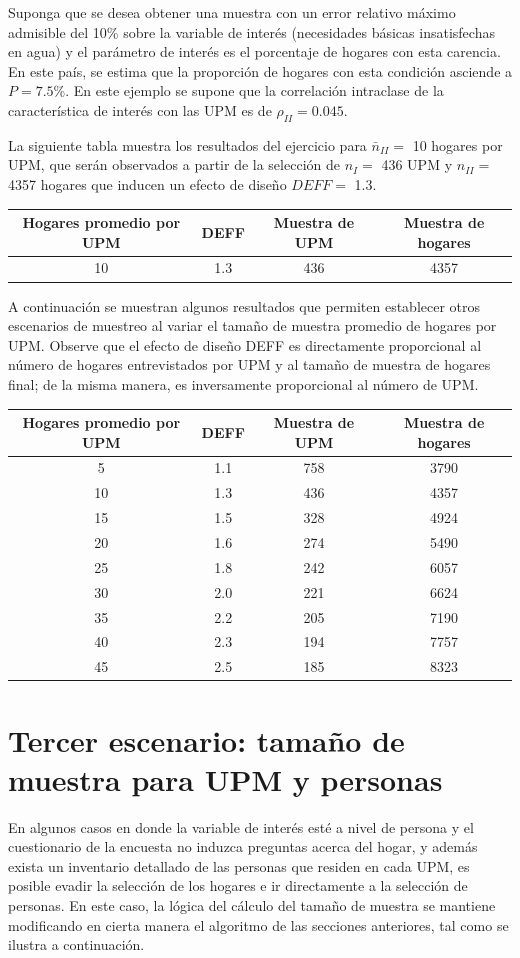 Suponga que se desea obtener una muestra con un error relativo máximo admisible del 10\% sobre la variable de interés (necesidades básicas insatisfechas en agua) y el parámetro de interés es el porcentaje de hogares con esta carencia. En este país, se estima que la proporción de hogares con esta condición asciende a \(P = 7.5\)\%. En este ejemplo se supone que la correlación intraclase de la característica de interés con las UPM es de \(\rho_{II} = 0.045\).

La siguiente tabla muestra los resultados del ejercicio para \(\bar{n}_{II} =\) 10 hogares por UPM, que serán observados a partir de la selección de \(n_{I} =\) 436 UPM y \(n_{II} =\) 4357 hogares que inducen un efecto de diseño \(DEFF =\) 1.3.

\begin{longtable}[]{@{}cccc@{}}
\toprule
Hogares promedio por UPM & DEFF & Muestra de UPM & Muestra de hogares\tabularnewline
\midrule
\endhead
10 & 1.3 & 436 & 4357\tabularnewline
\bottomrule
\end{longtable}

A continuación se muestran algunos resultados que permiten establecer otros escenarios de muestreo al variar el tamaño de muestra promedio de hogares por UPM. Observe que el efecto de diseño DEFF es directamente proporcional al número de hogares entrevistados por UPM y al tamaño de muestra de hogares final; de la misma manera, es inversamente proporcional al número de UPM.

\begin{longtable}[]{@{}cccc@{}}
\toprule
Hogares promedio por UPM & DEFF & Muestra de UPM & Muestra de hogares\tabularnewline
\midrule
\endhead
5 & 1.1 & 758 & 3790\tabularnewline
10 & 1.3 & 436 & 4357\tabularnewline
15 & 1.5 & 328 & 4924\tabularnewline
20 & 1.6 & 274 & 5490\tabularnewline
25 & 1.8 & 242 & 6057\tabularnewline
30 & 2.0 & 221 & 6624\tabularnewline
35 & 2.2 & 205 & 7190\tabularnewline
40 & 2.3 & 194 & 7757\tabularnewline
45 & 2.5 & 185 & 8323\tabularnewline
\bottomrule
\end{longtable}

\hypertarget{tercer-escenario-tamano-de-muestra-para-upm-y-personas}{%
\section{Tercer escenario: tamaño de muestra para UPM y personas}\label{tercer-escenario-tamano-de-muestra-para-upm-y-personas}}

En algunos casos en donde la variable de interés esté a nivel de persona y el cuestionario de la encuesta no induzca preguntas acerca del hogar, y además exista un inventario detallado de las personas que residen en cada UPM, es posible evadir la selección de los hogares e ir directamente a la selección de personas. En este caso, la lógica del cálculo del tamaño de muestra se mantiene modificando en cierta manera el algoritmo de las secciones anteriores, tal como se ilustra a continuación.

